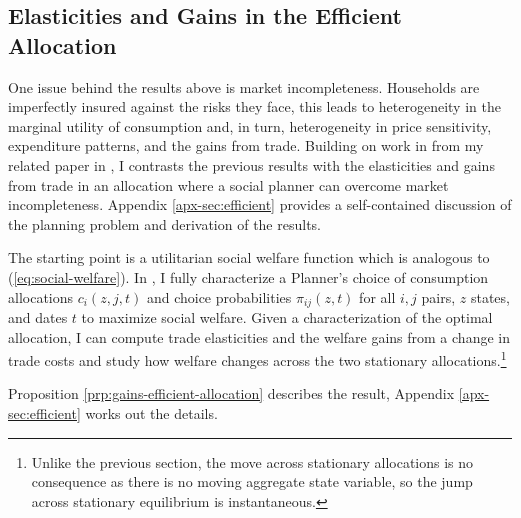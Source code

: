 \documentclass[12pt,pdftex]{article}
\begin{document}
\begin{onehalfspacing}
\subsection{Elasticities and Gains in the Efficient Allocation}\label{sec:efficient}

One issue behind the results above is market incompleteness. Households are imperfectly insured against the risks they face, this leads to heterogeneity in the marginal utility of consumption and, in turn, heterogeneity in price sensitivity, expenditure patterns, and the gains from trade. Building on work in from my related paper in \citet{waughoptimal}, I contrasts the previous results with the elasticities and gains from trade in an allocation where a social planner can overcome market incompleteness. Appendix \ref{apx-sec:efficient} provides a self-contained discussion of the planning problem and derivation of the results.

The starting point is a utilitarian social welfare function which is analogous to (\ref{eq:social-welfare}). In \citet{waughoptimal}, I fully characterize a Planner's choice of consumption allocations $c_{i}(z, j, t)$ and choice probabilities $\pi_{ij}(z,t)$ for all $i,j$ pairs, $z$ states, and dates $t$ to maximize social welfare. Given a characterization of the optimal allocation, I can compute trade elasticities and the welfare gains from a change in trade costs and study how welfare changes across the two stationary allocations.\footnote{Unlike the previous section, the move across stationary allocations is no consequence as there is no moving aggregate state variable, so the jump across stationary equilibrium is instantaneous.}

Proposition \ref{prp:gains-efficient-allocation} describes the result, Appendix \ref{apx-sec:efficient} works out the details.


\end{onehalfspacing}
\end{document}

